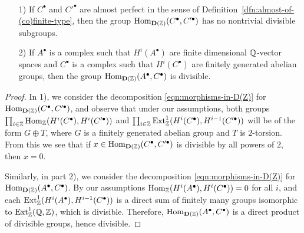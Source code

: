 \documentclass{article}
\numberwithin{equation}{section}
\begin{document}
\begin{appendices}
\begin{lemma}
  \label{lemma:morphisms-inDAb-not-divisible}
  ~

  \begin{enumerate}
  \item[1)] If $C^\bullet$ and $C'^\bullet$ are almost perfect in the sense of
    Definition~\ref{dfn:almost-of-(co)finite-type}, then the group
    $\operatorname{Hom}_{\mathbf{D} (\mathbb{Z})} (C^\bullet, C'^\bullet)$ has no nontrivial
    divisible subgroups.

  \item[2)] If $A^\bullet$ is a complex such that $H^i (A^\bullet)$ are finite
    dimensional $\mathbb{Q}$-vector spaces and $C^\bullet$ is a complex such that
    $H^i (C^\bullet)$ are finitely generated abelian groups, then the group
    $\operatorname{Hom}_{\mathbf{D} (\mathbb{Z})} (A^\bullet, C^\bullet)$ is divisible.
  \end{enumerate}

  \begin{proof}
    In 1), we consider the decomposition \eqref{eqn:morphisms-in-D(Z)} for
    $\operatorname{Hom}_{\mathbf{D} (\mathbb{Z})} (C^\bullet, C'^\bullet)$, and observe that under
    our assumptions, both groups
    $\prod_{i\in\mathbb{Z}} \operatorname{Hom}_{\mathbb{Z}} (H^i (C^\bullet), H^i (C'^\bullet))$ and
    $\prod_{i\in\mathbb{Z}} \operatorname{Ext}_{\mathbb{Z}}^1 (H^i (C^\bullet), H^{i-1} (C'^\bullet))$ will be of
    the form $G \oplus T$, where $G$ is a finitely generated abelian group and
    $T$ is $2$-torsion. From this we see that if
    $x \in \operatorname{Hom}_{\mathbf{D} (\mathbb{Z})} (C^\bullet, C'^\bullet)$ is divisible by all
    powers of $2$, then $x = 0$.

    Similarly, in part 2), we consider the decomposition
    \eqref{eqn:morphisms-in-D(Z)} for
    $\operatorname{Hom}_{\mathbf{D} (\mathbb{Z})} (A^\bullet, C^\bullet)$. By our assumptions
    $\operatorname{Hom}_{\mathbb{Z}} (H^i (A^\bullet), H^i (C^\bullet)) = 0$ for all $i$, and each
    $\operatorname{Ext}_{\mathbb{Z}}^1 (H^i (A^\bullet), H^{i-1} (C^\bullet))$ is a direct sum of
    finitely many groups isomorphic to $\operatorname{Ext}_{\mathbb{Z}}^1 (\mathbb{Q},\mathbb{Z})$, which is
    divisible. Therefore, $\operatorname{Hom}_{\mathbf{D} (\mathbb{Z})} (A^\bullet, C^\bullet)$ is
    a direct product of divisible groups, hence divisible.
  \end{proof}
\end{lemma}


\end{appendices}
\end{document}
